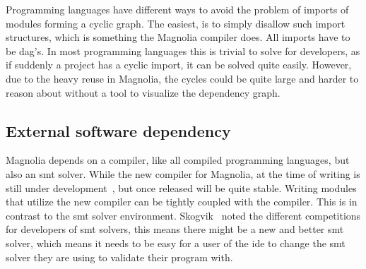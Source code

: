 Programming languages have different ways to avoid the problem of imports of
modules forming a cyclic graph. The easiest, is to simply disallow such import
structures, which is something the Magnolia compiler does. All imports have to be
\gls*{dag}'s. In most programming languages this is trivial to solve for
developers, as if suddenly a project has a cyclic import, it can be solved quite
easily. However, due to the heavy reuse in Magnolia, the cycles could be quite
large and harder to reason about without a tool to visualize the dependency graph.

\subsection{External software dependency}

Magnolia depends on a compiler, like all compiled programming languages, but
also an \gls*{smt} solver. While the new compiler for Magnolia, at the time of
writing is still under development~\cite{wiig}, but once released will be quite
stable. Writing modules that utilize the new compiler can be tightly coupled
with the compiler. This is in contrast to the \gls*{smt} solver environment.
Skogvik~\cite{beateVerification} noted the different competitions for developers
of \gls*{smt} solvers, this means there might be a new and better \gls*{smt}
solver, which means it needs to be easy for a user of the \gls*{ide} to change
the \gls*{smt} solver they are using to validate their program with.
